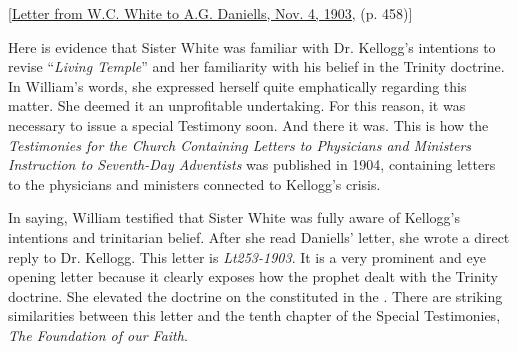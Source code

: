 [\href{https://ellenwhite.org/letterbooks/555}{Letter from W.C. White to A.G. Daniells, Nov. 4, 1903,} (p. 458)]

Here is evidence that Sister White was familiar with Dr. Kellogg's intentions to revise “\textit{Living Temple}” and her familiarity with his belief in the Trinity doctrine. In William's words, she expressed herself quite emphatically regarding this matter. She deemed it an unprofitable undertaking. For this reason, it was necessary to issue a special Testimony soon. And there it was. This is how the \textit{Testimonies for the Church Containing Letters to Physicians and Ministers Instruction to Seventh-Day Adventists} was published in 1904, containing letters to the physicians and ministers connected to Kellogg's crisis.  

In saying, William testified that Sister White was fully aware of Kellogg's intentions and trinitarian belief. After she read Daniells’ letter, she wrote a direct reply to Dr. Kellogg. This letter is \textit{Lt253-1903}. It is a very prominent and eye opening letter because it clearly exposes how the prophet dealt with the Trinity doctrine. She elevated the doctrine on the  constituted in the . There are striking similarities between this letter and the tenth chapter of the Special Testimonies, \textit{The Foundation of our Faith}.